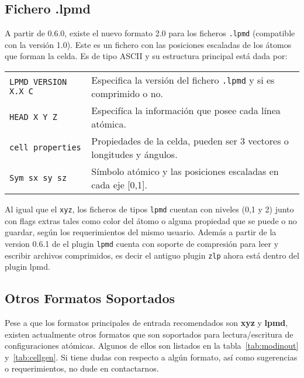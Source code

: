 \subsection{Fichero .lpmd}

A partir de {\lpmd} 0.6.0, existe el nuevo formato 2.0 para los ficheros \verb|.lpmd| (compatible con la versi\'on 1.0). Este es un fichero con las posiciones escaladas de los \'atomos que forman la celda. Es de tipo ASCII y su estructura principal est\'a dada por:

\begin{center}
 \begin{tabular}{l|l}
 \verb|LPMD VERSION X.X C| & Especifica la versi\'on del fichero \verb|.lpmd| y si es comprimido o no. \\
 \verb|HEAD X Y Z| & Especif\'ica la informaci\'on que posee cada l\'inea at\'omica. \\
 \verb|cell properties | & Propiedades de la celda, pueden ser 3 vectores o longitudes y \'angulos. \\
 \verb|Sym sx sy sz| & S\'imbolo at\'omico y las posiciones escaladas en cada eje [0,1].\\
\end{tabular}
\end{center}

Al igual que el \verb|xyz|, los ficheros de tipos \verb|lpmd| cuentan con niveles (0,1 y 2) junto con flags extras tales como color del \'atomo o alguna propiedad que se puede o no guardar, seg\'un los requerimientos del mismo usuario. Adem\'as a partir de la version 0.6.1 de {\lpmd} el plugin \verb|lpmd| cuenta con soporte de compresi\'on para leer y escribir archivos comprimidos, es decir el antiguo plugin \verb|zlp| ahora est\'a dentro del plugin lpmd.

\subsection{Otros Formatos Soportados}

Pese a que los formatos principales de entrada recomendados son \textbf{xyz} y \textbf{lpmd}, existen actualmente otros formatos que son soportados para lectura/escritura de configuraciones at\'omicas. Algunos de ellos son listados en la tabla~\ref{tab:modinout} y~\ref{tab:cellgen}. Si tiene dudas con respecto a alg\'un formato, as\'i como sugerencias o requerimientos, no dude en contactarnos.

